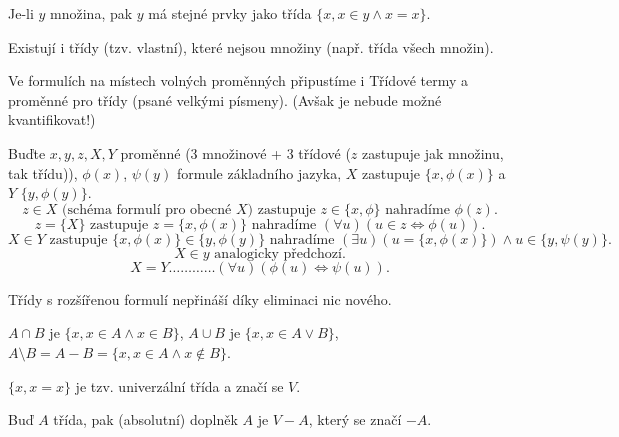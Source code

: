 \documentclass[12pt]{article}                   %
\begin{document}
        \begin{poznamka}
            Je-li $y$ množina, pak $y$ má stejné prvky jako třída $\{x, x \in y \land x = x\}$.
        \end{poznamka}

        \begin{poznamka}
            Existují i třídy (tzv. vlastní), které nejsou množiny (např. třída všech množin).
        \end{poznamka}

        \begin{definice}
            Ve formulích na místech volných proměnných připustíme i Třídové termy a proměnné pro třídy (psané velkými písmeny). (Avšak je nebude možné kvantifikovat!)
        \end{definice}

        \begin{definice}
                Buďte $x, y, z, X, Y$ proměnné (3 množinové + 3 třídové ($z$ zastupuje jak množinu, tak třídu)), $\phi(x)$, $\psi(y)$ formule základního jazyka, $X$ zastupuje $\{x, \phi(x)\}$ a $Y$ $\{y, \phi(y)\}$.
            $$ z \in X \text{ (schéma formulí pro obecné $X$) zastupuje } z \in \{x, \phi\} \text{ nahradíme } \phi(z). $$
            $$ z = \{X\} \text{ zastupuje } z = \{x, \phi(x)\} \text{ nahradíme } (\forall u)(u \in z \Leftrightarrow \phi(u)). $$
            $$ X \in Y \text{ zastupuje } \{x, \phi(x)\} \in \{y, \phi(y)\} \text{ nahradíme } (\exists u)(u = \{x, \phi(x)\}) \land u \in \{y, \psi(y)\}. $$ 
            $$ X \in y \text{ analogicky předchozí.} $$
            $$ X = Y … … … … (\forall u)(\phi(u) \Leftrightarrow \psi(u)). $$ 
        \end{definice}

        \begin{poznamka}
            Třídy s rozšířenou formulí nepřináší díky eliminaci nic nového.
        \end{poznamka}

        \begin{definice}
            $A \cap B$ je $\{x, x \in A \land x \in B\}$, $A \cup B$ je $\{x, x \in A \lor B\}$, $A \setminus B = A - B = \{x, x \in A \land x \notin B\}$.
        \end{definice}

        \begin{definice}
            $\{x, x = x\}$ je tzv. univerzální třída a značí se $V$.

            Buď $A$ třída, pak (absolutní) doplněk $A$ je $V - A$, který se značí $-A$.
        \end{definice}
\end{document}
